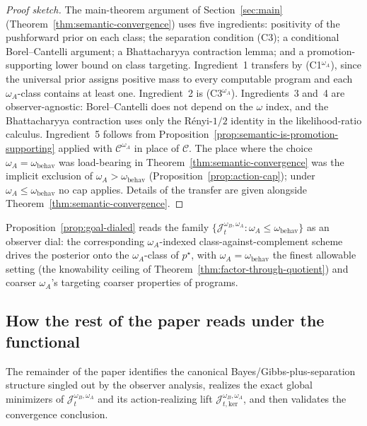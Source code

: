 \documentclass[11pt]{article}
\theoremstyle{definition}
\theoremstyle{remark}
\newcommand{\Ccal}{\mathcal{C}}
\begin{document}
\begin{proof}[Proof sketch]
The main-theorem argument of Section~\ref{sec:main} (Theorem~\ref{thm:semantic-convergence}) uses five ingredients: positivity of the pushforward prior on each class; the separation condition (C3); a conditional Borel--Cantelli argument; a Bhattacharyya contraction lemma; and a promotion-supporting lower bound on class targeting. Ingredient~1 transfers by (C1$^{\omega_A}$), since the universal prior assigns positive mass to every computable program and each $\omega_A$-class contains at least one. Ingredient~2 is (C3$^{\omega_A}$). Ingredients~3 and~4 are observer-agnostic: Borel--Cantelli does not depend on the $\omega$ index, and the Bhattacharyya contraction uses only the R\'enyi-$1/2$ identity in the likelihood-ratio calculus. Ingredient~5 follows from Proposition~\ref{prop:semantic-is-promotion-supporting} applied with $\Ccal^{\omega_A}$ in place of $\Ccal$. The place where the choice $\omega_A=\omega_{\mathrm{behav}}$ was load-bearing in Theorem~\ref{thm:semantic-convergence} was the implicit exclusion of $\omega_A>\omega_{\mathrm{behav}}$ (Proposition~\ref{prop:action-cap}); under $\omega_A\le\omega_{\mathrm{behav}}$ no cap applies. Details of the transfer are given alongside Theorem~\ref{thm:semantic-convergence}.
\end{proof}

Proposition~\ref{prop:goal-dialed} reads the family $\{\mathcal J_t^{\omega_B,\omega_A}:\omega_A\le\omega_{\mathrm{behav}}\}$ as an observer dial: the corresponding $\omega_A$-indexed class-against-complement scheme drives the posterior onto the $\omega_A$-class of $p^\star$, with $\omega_A=\omega_{\mathrm{behav}}$ the finest allowable setting (the knowability ceiling of Theorem~\ref{thm:factor-through-quotient}) and coarser $\omega_A$'s targeting coarser properties of programs.

\subsection{How the rest of the paper reads under the functional}
\label{sec:functional-forward-plan}

The remainder of the paper identifies the canonical Bayes/Gibbs-plus-separation structure singled out by the observer analysis, realizes the exact global minimizers of $\mathcal J_t^{\omega_B,\omega_A}$ and its action-realizing lift $\mathcal J_{t,\mathrm{ker}}^{\omega_B,\omega_A}$, and then validates the convergence conclusion.
\end{document}
